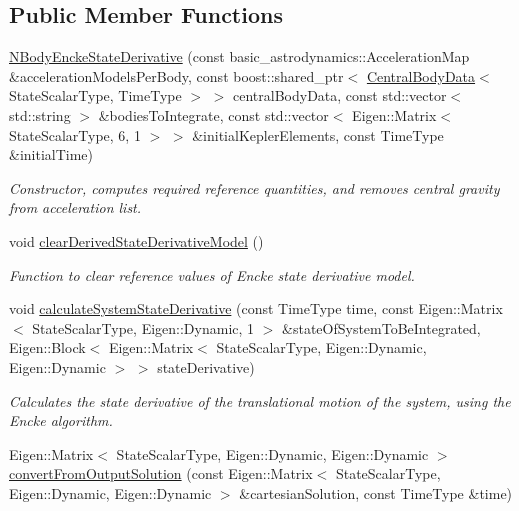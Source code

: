 \subsection*{Public Member Functions}
\begin{DoxyCompactItemize}
\item 
\hyperlink{classtudat_1_1propagators_1_1NBodyEnckeStateDerivative_ab72d2f14a2e5dec244a3611d763c8e4c}{N\+Body\+Encke\+State\+Derivative} (const basic\+\_\+astrodynamics\+::\+Acceleration\+Map \&acceleration\+Models\+Per\+Body, const boost\+::shared\+\_\+ptr$<$ \hyperlink{classtudat_1_1propagators_1_1CentralBodyData}{Central\+Body\+Data}$<$ State\+Scalar\+Type, Time\+Type $>$ $>$ central\+Body\+Data, const std\+::vector$<$ std\+::string $>$ \&bodies\+To\+Integrate, const std\+::vector$<$ Eigen\+::\+Matrix$<$ State\+Scalar\+Type, 6, 1 $>$ $>$ \&initial\+Kepler\+Elements, const Time\+Type \&initial\+Time)
\begin{DoxyCompactList}\small\item\em Constructor, computes required reference quantities, and removes central gravity from acceleration list. \end{DoxyCompactList}\item 
void \hyperlink{classtudat_1_1propagators_1_1NBodyEnckeStateDerivative_a02845b9e47c1bc44fe5aeb4fcee3bcf1}{clear\+Derived\+State\+Derivative\+Model} ()
\begin{DoxyCompactList}\small\item\em Function to clear reference values of Encke state derivative model. \end{DoxyCompactList}\item 
void \hyperlink{classtudat_1_1propagators_1_1NBodyEnckeStateDerivative_a4e919b4ac2c5314fa628a696904e3567}{calculate\+System\+State\+Derivative} (const Time\+Type time, const Eigen\+::\+Matrix$<$ State\+Scalar\+Type, Eigen\+::\+Dynamic, 1 $>$ \&state\+Of\+System\+To\+Be\+Integrated, Eigen\+::\+Block$<$ Eigen\+::\+Matrix$<$ State\+Scalar\+Type, Eigen\+::\+Dynamic, Eigen\+::\+Dynamic $>$ $>$ state\+Derivative)
\begin{DoxyCompactList}\small\item\em Calculates the state derivative of the translational motion of the system, using the Encke algorithm. \end{DoxyCompactList}\item 
Eigen\+::\+Matrix$<$ State\+Scalar\+Type, Eigen\+::\+Dynamic, Eigen\+::\+Dynamic $>$ \hyperlink{classtudat_1_1propagators_1_1NBodyEnckeStateDerivative_ae452f6473f5d4ec89e7c8b64b6962bd9}{convert\+From\+Output\+Solution} (const Eigen\+::\+Matrix$<$ State\+Scalar\+Type, Eigen\+::\+Dynamic, Eigen\+::\+Dynamic $>$ \&cartesian\+Solution, const Time\+Type \&time)

\end{DoxyCompactItemize}

